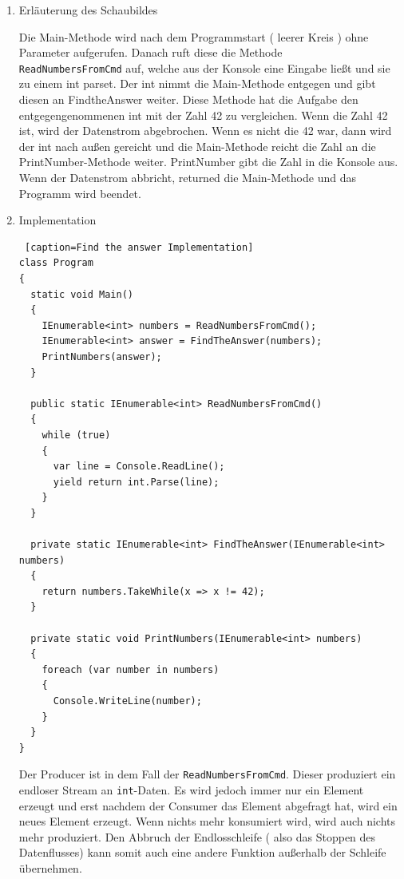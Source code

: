 \begin{enumerate}
\item Erläuterung des Schaubildes

Die  Main-Methode wird nach dem Programmstart ( leerer Kreis ) ohne Parameter aufgerufen.
Danach ruft diese die Methode \\\texttt{ReadNumbersFromCmd} auf, welche aus der Konsole eine Eingabe ließt und sie
zu einem int parset. Der int nimmt die Main-Methode entgegen und gibt diesen an FindtheAnswer weiter.
Diese Methode hat die Aufgabe den entgegengenommenen int mit der Zahl 42 zu vergleichen. Wenn die Zahl 42 ist, wird der Datenstrom
abgebrochen. Wenn es nicht die 42 war, dann wird der int nach außen gereicht und die  Main-Methode reicht die Zahl an die
PrintNumber-Methode weiter. PrintNumber gibt die Zahl in die Konsole aus.
Wenn der Datenstrom abbricht, returned die Main-Methode und das Programm wird beendet.

\item Implementation


\begin{lstlisting} [caption=Find the answer Implementation]
class Program
{
  static void Main()
  {
    IEnumerable<int> numbers = ReadNumbersFromCmd();
    IEnumerable<int> answer = FindTheAnswer(numbers);
    PrintNumbers(answer);
  }

  public static IEnumerable<int> ReadNumbersFromCmd()
  {
    while (true)
    {
      var line = Console.ReadLine();
      yield return int.Parse(line);
    }
  }

  private static IEnumerable<int> FindTheAnswer(IEnumerable<int> numbers)
  {
    return numbers.TakeWhile(x => x != 42);
  }

  private static void PrintNumbers(IEnumerable<int> numbers)
  {
    foreach (var number in numbers)
    {
      Console.WriteLine(number);
    }
  }
}
\end{lstlisting}

Der Producer ist in dem Fall der \texttt{ReadNumbersFromCmd}.
Dieser produziert ein endloser Stream an \texttt{int}-Daten.
Es wird jedoch immer nur ein Element erzeugt und erst nachdem der Consumer das
Element abgefragt hat, wird ein neues Element erzeugt.
Wenn nichts mehr konsumiert wird, wird auch nichts mehr produziert.
Den Abbruch der Endlosschleife ( also das Stoppen des Datenflusses) kann somit auch eine andere Funktion außerhalb der Schleife
übernehmen.
\end{enumerate}




